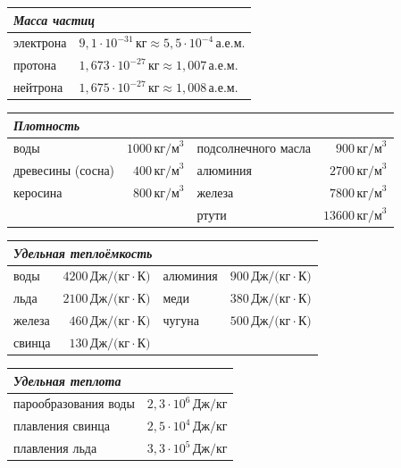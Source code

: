 \par\smallskip
\noindent\begin{tabularx}{\linewidth}{|X|X|}\hline
\multicolumn{2}{|l|}{\textbf{\itshape Масса частиц}}\\\hline
электрона & $9{,}1\cdot10^{-31}\,\text{кг}\approx5{,}5\cdot10^{-4}\,\text{а.е.м.}$\\
протона & $1{,}673\cdot10^{-27}\,\text{кг}\approx1{,}007\,\text{а.е.м.}$\\
нейтрона & $1{,}675\cdot10^{-27}\,\text{кг}\approx1{,}008\,\text{а.е.м.}$\\\hline
\end{tabularx}
\par\smallskip
\noindent\begin{tabularx}{\linewidth}{|X|r|X|r|}\hline
\multicolumn{4}{|l|}{\textbf{\itshape Плотность}}\\\hline
воды & $1000\,\text{кг/м}^3$ & подсолнечного масла & $900\,\text{кг/м}^3$\\
древесины (сосна) & $400\,\text{кг/м}^3$ & алюминия & $2700\,\text{кг/м}^3$\\
керосина & $800\,\text{кг/м}^3$ & железа & $7800\,\text{кг/м}^3$\\
 & & ртути & $13600\,\text{кг/м}^3$\\\hline
\end{tabularx}
\noindent\begin{tabularx}{\linewidth}{|X|r|X|r|}\hline
\multicolumn{4}{|l|}{\textbf{\itshape Удельная теплоёмкость}}\\\hline
воды & $4200\,\text{Дж/(кг}\cdot\text{К)}$ & алюминия & $900\,\text{Дж/(кг}\cdot\text{К)}$\\
льда & $2100\,\text{Дж/(кг}\cdot\text{К)}$ & меди & $380\,\text{Дж/(кг}\cdot\text{К)}$\\
железа & $460\,\text{Дж/(кг}\cdot\text{К)}$ & чугуна & $500\,\text{Дж/(кг}\cdot\text{К)}$\\\hline
свинца & $130\,\text{Дж/(кг}\cdot\text{К)}$ & & \\\hline
\end{tabularx}
\par\smallskip
\noindent\begin{tabularx}{\linewidth}{|X|r|}\hline
\multicolumn{2}{|l|}{\textbf{\itshape Удельная теплота}}\\\hline
парообразования воды & $2{,}3\cdot10^6\,\text{Дж/кг}$\\
плавления свинца & $2{,}5\cdot10^4\,\text{Дж/кг}$\\
плавления льда & $3{,}3\cdot10^5\,\text{Дж/кг}$\\\hline
\end{tabularx}
